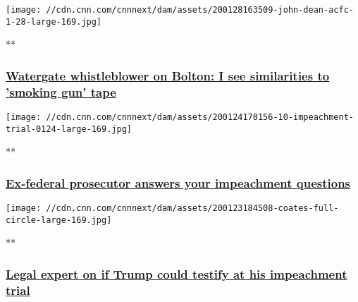 \href{/videos/politics/2020/01/28/trump-impeachment-trial-questions-john-dean-acfc-full-episode-vpx.cnn/video/playlists/acfc-full-episodes/}{}

\texttt{[image: //cdn.cnn.com/cnnnext/dam/assets/200128163509-john-dean-acfc-1-28-large-169.jpg]}

**

\hypertarget{watergate-whistleblower-on-bolton-i-see-similarities-to-smoking-gun-tape}{%
\subsubsection{\texorpdfstring{\href{/videos/politics/2020/01/28/trump-impeachment-trial-questions-john-dean-acfc-full-episode-vpx.cnn/video/playlists/acfc-full-episodes/}{Watergate
whistleblower on Bolton: I see similarities to 'smoking gun'
tape}}{Watergate whistleblower on Bolton: I see similarities to 'smoking gun' tape}}\label{watergate-whistleblower-on-bolton-i-see-similarities-to-smoking-gun-tape}}

\href{/videos/politics/2020/01/24/trump-impeachment-trial-questions-anne-milgram-acfc-full-episode-vpx.cnn/video/playlists/acfc-full-episodes/}{}

\texttt{[image: //cdn.cnn.com/cnnnext/dam/assets/200124170156-10-impeachment-trial-0124-large-169.jpg]}

**

\hypertarget{ex-federal-prosecutor-answers-your-impeachment-questions}{%
\subsubsection{\texorpdfstring{\href{/videos/politics/2020/01/24/trump-impeachment-trial-questions-anne-milgram-acfc-full-episode-vpx.cnn/video/playlists/acfc-full-episodes/}{Ex-federal
prosecutor answers your impeachment
questions}}{Ex-federal prosecutor answers your impeachment questions}}\label{ex-federal-prosecutor-answers-your-impeachment-questions}}

\href{/videos/politics/2020/01/23/trump-impeachment-trial-questions-coates-acfc-full-episode-vpx.cnn/video/playlists/acfc-full-episodes/}{}

\texttt{[image: //cdn.cnn.com/cnnnext/dam/assets/200123184508-coates-full-circle-large-169.jpg]}

**

\hypertarget{legal-expert-on-if-trump-could-testify-at-his-impeachment-trial-}{%
\subsubsection{\texorpdfstring{\href{/videos/politics/2020/01/23/trump-impeachment-trial-questions-coates-acfc-full-episode-vpx.cnn/video/playlists/acfc-full-episodes/}{Legal
expert on if Trump could testify at his impeachment trial
}}{Legal expert on if Trump could testify at his impeachment trial }}\label{legal-expert-on-if-trump-could-testify-at-his-impeachment-trial-}}

